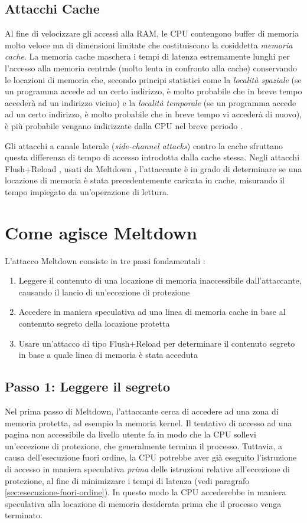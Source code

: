 \subsection{Attacchi Cache}
Al fine di velocizzare gli accessi alla RAM, le CPU contengono buffer di memoria molto veloce ma di dimensioni limitate che costituiscono la cosiddetta \emph{memoria cache}. La memoria cache maschera i tempi di latenza estremamente lunghi per l'accesso alla memoria centrale (molto lenta in confronto alla cache) conservando le locazioni di memoria che, secondo principi statistici come la \emph{località spaziale} (se un programma accede ad un certo indirizzo, è molto probabile che in breve tempo accederà ad un indirizzo vicino)  e la \emph{località temporale} (se un programma accede ad un certo indirizzo, è molto probabile che in breve tempo vi accederà di nuovo), è più probabile vengano indirizzate dalla CPU nel breve periodo \cite{lettieri:cache}.

Gli attacchi a canale laterale (\emph{side-channel attacks}) contro la cache sfruttano questa differenza di tempo di accesso introdotta dalla cache stessa. Negli attacchi Flush+Reload \cite{yaron:flush-reload}, usati da Meltdown \cite{lipp:meltdown}, l'attaccante è in grado di determinare se una locazione di memoria è stata precedentemente caricata in cache, misurando il tempo impiegato da un'operazione di lettura.

\section{Come agisce Meltdown}
L'attacco Meltdown consiste in tre passi fondamentali \cite{lipp:meltdown}:
\begin{enumerate}
	\item Leggere il contenuto di una locazione di memoria inaccessibile dall'attaccante, causando il lancio di un'eccezione di protezione
	\item Accedere in maniera speculativa ad una linea di memoria cache in base al contenuto segreto della locazione protetta
	\item Usare un'attacco di tipo Flush+Reload per determinare il contenuto segreto in base a quale linea di memoria è stata acceduta
\end{enumerate}

\subsection{Passo 1: Leggere il segreto}
Nel prima passo di Meltdown, l'attaccante cerca di accedere ad una zona di memoria protetta, ad esempio la memoria kernel.
Il tentativo di accesso ad una pagina non accessibile da livello utente fa in modo che la CPU sollevi un'eccezione di protezione, che generalmente termina il processo. 
Tuttavia, a causa dell'esecuzione fuori ordine, la CPU potrebbe aver già eseguito l'istruzione di accesso in maniera speculativa \emph{prima} delle istruzioni relative all'eccezione di protezione, al fine di minimizzare i tempi di latenza (vedi paragrafo \ref{sec:esecuzione-fuori-ordine}).
In questo modo la CPU accederebbe in maniera speculativa alla locazione di memoria desiderata prima che il processo venga terminato.

